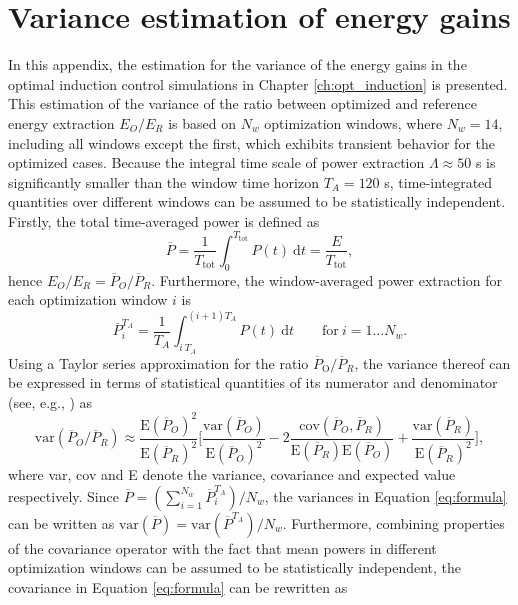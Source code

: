 \chapter{Variance estimation of energy gains}\label{ch:app_variance}

In this appendix, the estimation for the variance of the energy gains in the optimal induction control simulations in Chapter \ref{ch:opt_induction} is presented. 
This estimation of the variance of the ratio between optimized and reference energy extraction $E_O/E_R$ is based on $N_w$ optimization windows, where $N_w = 14$, including all windows except the first, which exhibits transient behavior for the optimized cases. Because the integral time scale of power extraction $\Lambda \approx 50$ s is significantly smaller than the window time horizon $T_A = 120$ s, time-integrated quantities over different windows can be assumed to be statistically independent. Firstly, the total time-averaged power is defined as 
\begin{equation}
\overline{P} = \frac{1}{T_\text{tot}} \int_{0}^{T_\text{tot}} P(t)~\text{d}t = \frac{E}{T_\text{tot}},
\end{equation}
hence $E_O/E_R = \overline{P}_O / \overline{P}_R$. Furthermore, the window-averaged power extraction for each optimization window $i$ is 
\begin{equation}
\overline{P}_{i}^{T_A} = \frac{1}{T_A} \int_{i\ T_A}^{(i+1)T_A} P(t)~\text{d}t \qquad \text{for}~i = 1 \dots N_w.
\end{equation}
\noindent Using a Taylor series approximation for the ratio $\overline{P}_{\text{O}} / \overline{P}_R$, the variance thereof can be expressed in terms of statistical quantities of its numerator and denominator (see, e.g., \citealp{kendalladvanced}) as 
\begin{equation}\label{eq:formula}
\text{var} (\overline{P}_O / \overline{P}_R) \approx \frac{\text{E}(\overline{P}_O)^2}{\text{E}(\overline{P}_R)^2} \bigg[ \frac{\text{var}(\overline{P}_O)}{\text{E}(\overline{P}_O)^2} - 2\frac{\text{cov}(\overline{P}_O, \overline{P}_R)}{\text{E}(\overline{P}_{R})\text{E}(\overline{P}_O)} + \frac{\text{var} (\overline{P}_R)}{\text{E}(\overline{P}_R)^2}  \bigg],
\end{equation}
\noindent where var, cov and E denote the variance, covariance and expected value respectively. Since $\overline{P} = (\sum_{i=1}^{N_w}\overline{P}_i^{T_A})/N_w$, the variances in Equation \eqref{eq:formula} can be written as $\text{var}(\overline{P}) = \text{var}(\overline{P}^{T_A})/N_w$. Furthermore, combining properties of the covariance operator with the fact that mean powers in different optimization windows can be assumed to be statistically independent, the covariance in Equation \eqref{eq:formula} can be rewritten as 
